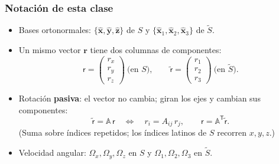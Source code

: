 \documentclass[spanish]{beamer}
\newcommand{\vect}[1]{\mathbf{#1}}              %
\newcommand{\uv}[1]{\hat{\mathbf{#1}}}          %
\newcommand{\Rot}{\mathbb{A}}                   %
\newcommand{\Slab}{S}                           %
\newcommand{\Scue}{\tilde{S}}                   %
\newcommand{\colLab}[1]{\mathsf{#1}}            %
\newcommand{\colCue}[1]{\tilde{\mathsf{#1}}}    %
\newcommand{\tr}{\mathsf{T}}                    %
\begin{document}
\begin{frame}
  \frametitle{Notación de esta clase}
  \begin{itemize}
    \item<1-> Bases ortonormales: $\{\uv{x},\uv{y},\uv{z}\}$ de $\Slab$ y
          $\{\uv{x}_1,\uv{x}_2,\uv{x}_3\}$ de $\Scue$.
    \item<2-> Un mismo vector $\vect{r}$ tiene dos columnas de componentes:
          \[
            \colLab{r}=\begin{pmatrix} r_x\\ r_y\\ r_z\end{pmatrix}\ \text{(en $\Slab$)},
            \qquad
            \colCue{r}=\begin{pmatrix} r_1\\ r_2\\ r_3\end{pmatrix}\ \text{(en $\Scue$)}.
          \]
    \item<3-> Rotación \textbf{pasiva}: el vector no cambia; giran los ejes y cambian sus
          componentes:
          \[
            \colCue{r}=\Rot\,\colLab{r}
            \quad\Longleftrightarrow\quad
            r_i=A_{ij}\,r_j ,
            \qquad
            \colLab{r}=\Rot^{\tr}\colCue{r}.
          \]
          (Suma sobre índices repetidos; los índices latinos de $\Slab$ recorren $x,y,z$.)
    \item<4-> Velocidad angular: $\Omega_x,\Omega_y,\Omega_z$ en $\Slab$ y
          $\Omega_1,\Omega_2,\Omega_3$ en $\Scue$.
  \end{itemize}
\end{frame}
\end{document}
